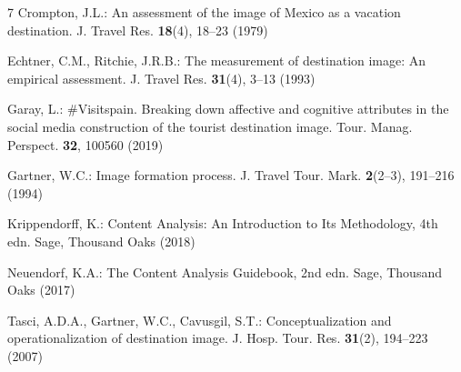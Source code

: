 \documentclass[runningheads]{llncs}
\begin{document}
\begin{thebibliography}{7}
Crompton, J.L.: An assessment of the image of Mexico as a vacation destination. J. Travel Res. \textbf{18}(4), 18--23 (1979)

Echtner, C.M., Ritchie, J.R.B.: The measurement of destination image: An empirical assessment. J. Travel Res. \textbf{31}(4), 3--13 (1993)

Garay, L.: \#Visitspain. Breaking down affective and cognitive attributes in the social media construction of the tourist destination image. Tour. Manag. Perspect. \textbf{32}, 100560 (2019)

Gartner, W.C.: Image formation process. J. Travel Tour. Mark. \textbf{2}(2--3), 191--216 (1994)

Krippendorff, K.: Content Analysis: An Introduction to Its Methodology, 4th edn. Sage, Thousand Oaks (2018)

Neuendorf, K.A.: The Content Analysis Guidebook, 2nd edn. Sage, Thousand Oaks (2017)

Tasci, A.D.A., Gartner, W.C., Cavusgil, S.T.: Conceptualization and operationalization of destination image. J. Hosp. Tour. Res. \textbf{31}(2), 194--223 (2007)
\end{thebibliography}
\end{document}
